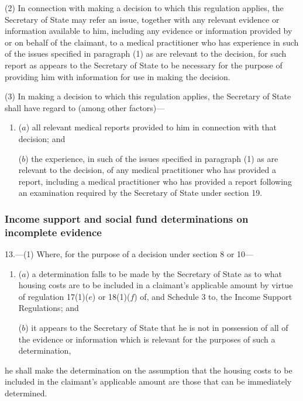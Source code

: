 \documentclass[12pt,a4paper]{article}
\begin{document}
(2) In connection with making a decision to which this regulation applies, the Secretary of State may refer an issue, together with any relevant evidence or information available to him, including any evidence or information provided by or on behalf of the claimant, to a medical practitioner who has experience in such of the issues specified in paragraph (1) as are relevant to the decision, for such report as appears to the Secretary of State to be necessary for the purpose of providing him with information for use in making the decision.

(3) In making a decision to which this regulation applies, the Secretary of State shall have regard to (among other factors)—
\begin{enumerate}\item[]
($a$) all relevant medical reports provided to him in connection with that decision; and

($b$) the experience, in such of the issues specified in paragraph (1) as are relevant to the decision, of any medical practitioner who has provided a report, including a medical practitioner who has provided a report following an examination required by the Secretary of State under section 19.
\end{enumerate}

\subsubsection[13. Income support and social fund determinations on incomplete evidence]{\sloppy Income support and social fund determinations on incomplete evidence}

13.—(1) Where, for the purpose of a decision under section 8 or 10—
\begin{enumerate}\item[]
($a$) a determination falls to be made by the Secretary of State as to what housing costs are to be included in a claimant’s applicable amount by virtue of regulation 17(1)($e$) or 18(1)($f$) of, and Schedule 3 to, the Income Support Regulations; and

($b$) it appears to the Secretary of State that he is not in possession of all of the evidence or information which is relevant for the purposes of such a determination,
\end{enumerate}
he shall make the determination on the assumption that the housing costs to be included in the claimant’s applicable amount are those that can be immediately determined.
\end{document}
